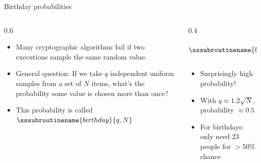 \documentclass[aspectratio=169, lualatex, handout]{beamer}
\begin{document}
\begin{frame}{Birthday probabilities}
	\begin{columns}[c]
		\begin{column}{0.6\textwidth}
			\begin{itemize}[<+->]
				\item Many cryptographic algorithms fail if two executions sample the same random value.
				\item General question: If we take $q$ independent uniform samples from a set of $N$ items, what's the probability some value is chosen more than once?
				\item This probability is called $\sssubroutinename{birthday}{q,N}$
			\end{itemize}
		\end{column}
		\begin{column}{0.4\textwidth}
			\begin{align*}
				\sssubroutinename{birthday}{q,N} = 1 - \prod_{i=1}^{q-1} \left(1 - \frac{i}{N}\right)
			\end{align*}
			\begin{itemize}[<+->]
				\item Surprisingly high probability!
				\item With $q \approx 1.2\sqrt{N}$, probability $\approx 0.5$
				\item For birthdays: only need 23 people for $>50\%$ chance
			\end{itemize}
		\end{column}
	\end{columns}
\end{frame}
\end{document}
